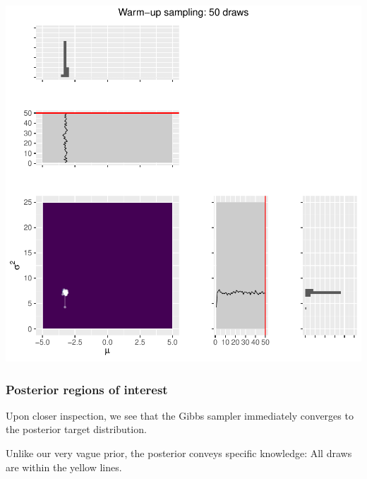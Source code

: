 \documentclass[
  11pt,
]{article}
\begin{document}
\begin{center}\includegraphics{01-02-lec_files/figure-latex/warmup-1} \end{center}

\hypertarget{posterior-regions-of-interest}{%
\subsubsection{Posterior regions of interest}\label{posterior-regions-of-interest}}

Upon closer inspection, we see that the Gibbs sampler immediately
converges to the posterior target distribution.

Unlike our very vague prior, the posterior conveys specific knowledge:
All draws are within the yellow lines.
\end{document}
